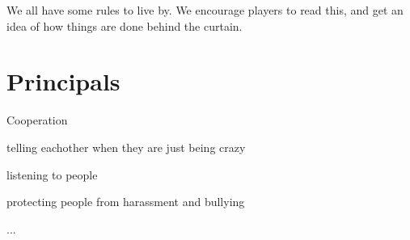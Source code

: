 We all have some rules to live by.
We encourage players to read this, and get an idea of how things are done behind the curtain.
\section{Principals}
Cooperation

telling eachother when they are just being crazy

listening to people

protecting people from harassment and bullying

...
